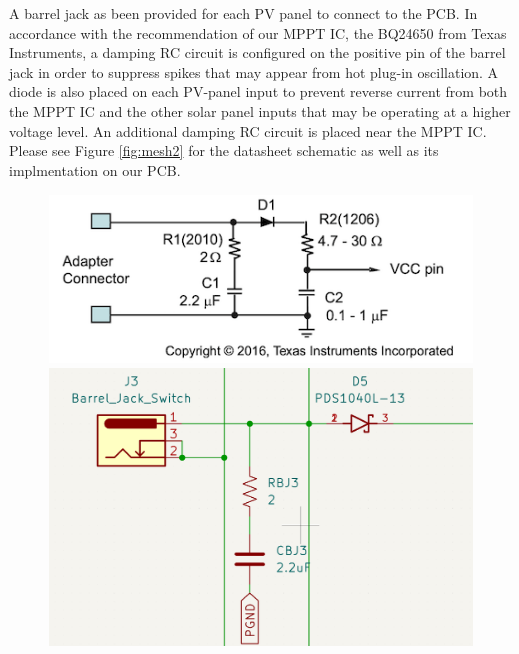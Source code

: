 \documentclass{article}
\begin{document}
A barrel jack as been provided for each PV panel to connect to the PCB. In accordance with the recommendation of our MPPT IC, the BQ24650 from Texas Instruments, a damping RC circuit is configured on the positive pin of the barrel jack in order to suppress spikes that may appear from hot plug-in oscillation. A diode is also placed on each PV-panel input to prevent reverse current from both the MPPT IC and the other solar panel inputs that may be operating at a higher voltage level. An additional damping RC circuit is placed near the MPPT IC. Please see Figure \ref{fig:mesh2} for the datasheet schematic as well as its implmentation on our PCB.

\begin{figure}[h]
	\centering
   	 \includegraphics[scale = 1]{TI-filter}
   	 \includegraphics[scale = 0.2]{Barrel-filter}
   	 \medskip

\end{figure}
\end{document}
